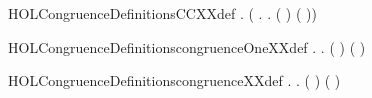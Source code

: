 \newcommand{\HOLCongruenceDate}{14 Giugno 2018}
\newcommand{\HOLCongruenceTime}{17:40}
\begin{SaveVerbatim}{HOLCongruenceDefinitionsCCXXdef}
\HOLTokenTurnstile{} \HOLSymConst{\HOLTokenForall{}}.   \HOLSymConst{=} (\HOLTokenLambda{} . \HOLSymConst{\HOLTokenForall{}}.   \HOLSymConst{\HOLTokenImp{}}  ( ) ( ))
\end{SaveVerbatim}
\newcommand{\HOLCongruenceDefinitionsCCXXdef}{\UseVerbatim{HOLCongruenceDefinitionsCCXXdef}}
\begin{SaveVerbatim}{HOLCongruenceDefinitionscongruenceOneXXdef}
\HOLTokenTurnstile{} \HOLSymConst{\HOLTokenForall{}}.
         \HOLSymConst{\HOLTokenEquiv{}}
         \HOLSymConst{\HOLTokenConj{}}
       \HOLSymConst{\HOLTokenForall{}}  .   \HOLSymConst{\HOLTokenImp{}}    \HOLSymConst{\HOLTokenImp{}}  ( ) ( )
\end{SaveVerbatim}
\newcommand{\HOLCongruenceDefinitionscongruenceOneXXdef}{\UseVerbatim{HOLCongruenceDefinitionscongruenceOneXXdef}}
\begin{SaveVerbatim}{HOLCongruenceDefinitionscongruenceXXdef}
\HOLTokenTurnstile{} \HOLSymConst{\HOLTokenForall{}}.
         \HOLSymConst{\HOLTokenEquiv{}}
         \HOLSymConst{\HOLTokenConj{}}
       \HOLSymConst{\HOLTokenForall{}}  .   \HOLSymConst{\HOLTokenImp{}}    \HOLSymConst{\HOLTokenImp{}}  ( ) ( )
\end{SaveVerbatim}
\newcommand{\HOLCongruenceDefinitionscongruenceXXdef}{\UseVerbatim{HOLCongruenceDefinitionscongruenceXXdef}}
